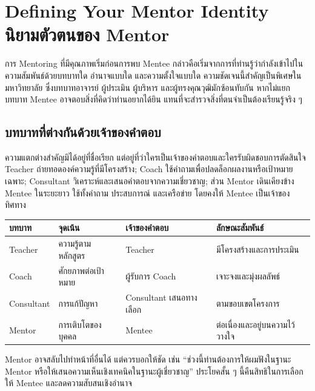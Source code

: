 \chapter{Defining Your Mentor Identity\\นิยามตัวตนของ Mentor}

การ Mentoring ที่มีคุณภาพเริ่มก่อนการพบ Mentee กล่าวคือเริ่มจากการที่ท่านรู้ว่ากำลังเข้าไปในความสัมพันธ์ด้วยบทบาทใด อำนาจแบบใด และความตั้งใจแบบใด ความชัดเจนนี้สำคัญเป็นพิเศษในมหาวิทยาลัย ซึ่งบทบาทอาจารย์ ผู้ประเมิน ผู้บริหาร และผู้ทรงคุณวุฒิมักซ้อนทับกัน หากไม่แยกบทบาท Mentee อาจตอบสิ่งที่คิดว่าท่านอยากได้ยิน แทนที่จะสำรวจสิ่งที่ตนจำเป็นต้องเรียนรู้จริง ๆ


\section{บทบาทที่ต่างกันด้วยเจ้าของคำตอบ}
ความแตกต่างสำคัญมิได้อยู่ที่ชื่อเรียก แต่อยู่ที่ว่าใครเป็นเจ้าของคำตอบและใครรับผิดชอบการตัดสินใจ Teacher ถ่ายทอดองค์ความรู้ที่มีโครงสร้าง; Coach ใช้คำถามเพื่อปลดล็อกผลงานหรือเป้าหมายเฉพาะ; Consultant วิเคราะห์และเสนอคำตอบจากความเชี่ยวชาญ; ส่วน Mentor เดินเคียงข้าง Mentee ในระยะยาว ใช้ทั้งคำถาม ประสบการณ์ และเครือข่าย โดยคงให้ Mentee เป็นเจ้าของทิศทาง

\begin{longtable}{P{.18\textwidth}P{.2\textwidth}P{.2\textwidth}P{.2\textwidth}}
\toprule
\textbf{บทบาท} & \textbf{จุดเน้น} & \textbf{เจ้าของคำตอบ} & \textbf{ลักษณะสัมพันธ์}\\
\midrule
Teacher & ความรู้ตามหลักสูตร & Teacher & มีโครงสร้างและการประเมิน\\
Coach & ศักยภาพต่อเป้าหมาย & ผู้รับการ Coach & เจาะจงและมุ่งผลลัพธ์\\
Consultant & การแก้ปัญหา & Consultant เสนอทางเลือก & ตามขอบเขตโครงการ\\
Mentor & การเติบโตของบุคคล & Mentee & ต่อเนื่องและอยู่บนความไว้วางใจ\\
\bottomrule
\end{longtable}

Mentor อาจสลับไปทำหน้าที่อื่นได้ แต่ควรบอกให้ชัด เช่น \enquote{ช่วงนี้ท่านต้องการให้ผมฟังในฐานะ Mentor หรือให้เสนอความเห็นเชิงเทคนิคในฐานะผู้เชี่ยวชาญ} ประโยคสั้น ๆ นี้คืนสิทธิในการเลือกให้ Mentee และลดความสับสนเชิงอำนาจ

